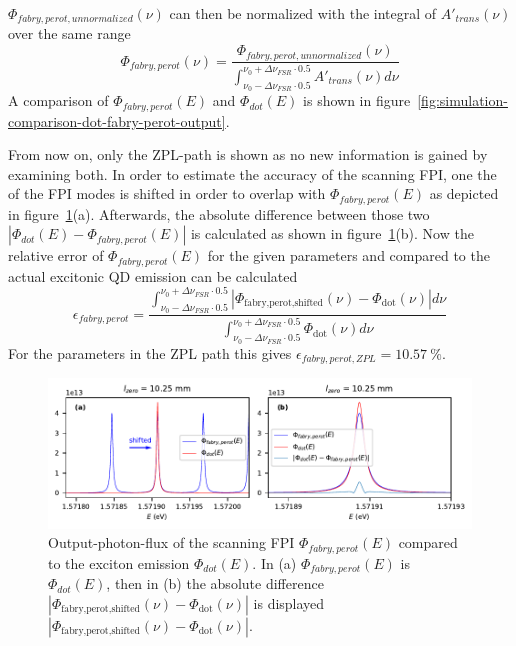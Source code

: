 $\Phi_{fabry,perot,unnormalized}(\nu)$ can then be normalized with the integral of $A'_{trans}(\nu)$ over the same range
\begin{equation}
\Phi_{fabry,perot}(\nu) =\frac{\Phi_{fabry,perot, unnormalized}(\nu)}{\int^{\nu_0 + \Delta \nu_{FSR}  \cdot 0.5}_{\nu_0 - \Delta \nu_{FSR}  \cdot 0.5} A'_{trans}(\nu) d\nu}
\end{equation}
A comparison of $\Phi_{fabry,perot}(E)$ and $\Phi_{dot}(E)$ is shown in figure~\ref{fig:simulation-comparison-dot-fabry-perot-output}.


From now on, only the \ac{ZPL}-path is shown as no new information is gained by examining both.
In order to estimate the accuracy of the scanning \ac{FPI}, one the of the \ac{FPI} modes is shifted in order to overlap with $\Phi_{fabry,perot}(E)$ as depicted in figure~\ref{fig:simulation-comparison-dot-fabry-perot-output-error}(a).
Afterwards, the absolute difference between those two $|\Phi_{dot}(E) - \Phi_{fabry,perot}(E)|$ is calculated as shown in figure~\ref{fig:simulation-comparison-dot-fabry-perot-output-error}(b).
Now the relative error of  $\Phi_{fabry,perot}(E)$  for the given parameters and compared to the actual excitonic \ac{QD} emission  can be calculated
\begin{equation}
\epsilon_{fabry,perot} = \frac{\int^{\nu_0 + \Delta \nu_{FSR} \cdot 0.5}_{\nu_0 - \Delta \nu_{FSR} \cdot 0.5} \left|\Phi_{\text{fabry,perot,shifted}}(\nu) - \Phi_{\text{dot}}(\nu)\right| d \nu }{\int^{\nu_0 + \Delta \nu_{FSR} \cdot 0.5}_{\nu_0 - \Delta \nu_{FSR} \cdot 0.5} \Phi_{\text{dot}}(\nu) d \nu}
\end{equation}
For the parameters in the \ac{ZPL} path this gives $\epsilon_{fabry,perot,ZPL}=\SI{10.57}{\percent}$.


\begin{figure}[H]
	\centering
	\includegraphics[width=\linewidth]{figures/fabry-perot/plots/simulation-comparison-dot-fabry-perot-output-error}
	\caption{Output-photon-flux of the scanning FPI $\Phi_{fabry,perot}(E)$ compared to the exciton emission $\Phi_{dot}(E)$.
	In (a) $\Phi_{fabry,perot}(E)$ is $\Phi_{dot}(E)$, then in (b) the absolute difference $\left|\Phi_{\text{fabry,perot,shifted}}(\nu) - \Phi_{\text{dot}}(\nu)\right|$ is displayed $\left|\Phi_{\text{fabry,perot,shifted}}(\nu) - \Phi_{\text{dot}}(\nu)\right|$.}
	\label{fig:simulation-comparison-dot-fabry-perot-output-error}
\end{figure}


